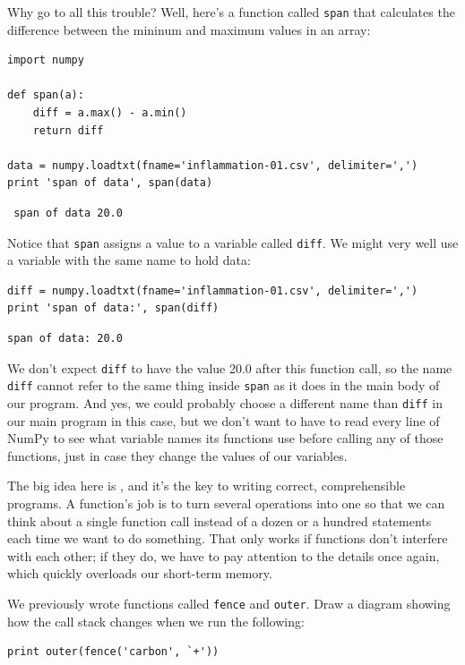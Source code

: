 \documentclass{book}
\begin{document}
Why go to all this trouble? Well, here's a function called \texttt{span}
that calculates the difference between the mininum and maximum values in
an array:

\begin{verbatim}
import numpy

def span(a):
    diff = a.max() - a.min()
    return diff

data = numpy.loadtxt(fname='inflammation-01.csv', delimiter=',')
print 'span of data', span(data)
\end{verbatim}

\begin{verbatim}
 span of data 20.0
\end{verbatim}

Notice that \texttt{span} assigns a value to a variable called
\texttt{diff}. We might very well use a variable with the same name to
hold data:

\begin{verbatim}
diff = numpy.loadtxt(fname='inflammation-01.csv', delimiter=',')
print 'span of data:', span(diff)
\end{verbatim}

\begin{verbatim}
span of data: 20.0
\end{verbatim}

We don't expect \texttt{diff} to have the value 20.0 after this function
call, so the name \texttt{diff} cannot refer to the same thing inside
\texttt{span} as it does in the main body of our program. And yes, we
could probably choose a different name than \texttt{diff} in our main
program in this case, but we don't want to have to read every line of
NumPy to see what variable names its functions use before calling any of
those functions, just in case they change the values of our variables.

The big idea here is , and it's
the key to writing correct, comprehensible programs. A function's job is
to turn several operations into one so that we can think about a single
function call instead of a dozen or a hundred statements each time we
want to do something. That only works if functions don't interfere with
each other; if they do, we have to pay attention to the details once
again, which quickly overloads our short-term memory.

\begin{challenge}
  We previously wrote functions called \texttt{fence} and
  \texttt{outer}. Draw a diagram showing how the call stack changes when
  we run the following:
\begin{verbatim}
print outer(fence('carbon', `+'))
\end{verbatim}
\end{challenge}
\end{document}
